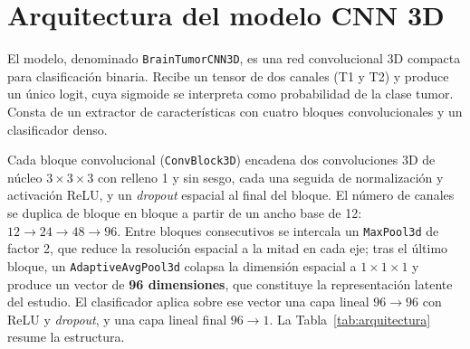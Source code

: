 \section{Arquitectura del modelo CNN 3D}

El modelo, denominado \texttt{BrainTumorCNN3D}, es una red convolucional 3D
compacta para clasificación binaria. Recibe un tensor de dos canales (T1 y T2) y
produce un único logit, cuya sigmoide se interpreta como probabilidad de la
clase tumor. Consta de un extractor de características con cuatro bloques
convolucionales y un clasificador denso.

Cada bloque convolucional (\texttt{ConvBlock3D}) encadena dos convoluciones 3D
de núcleo $3\times3\times3$ con relleno 1 y sin sesgo, cada una seguida de
normalización y activación ReLU, y un \emph{dropout} espacial al final del
bloque. El número de canales se duplica de bloque en bloque a partir de un ancho
base de 12: $12 \rightarrow 24 \rightarrow 48 \rightarrow 96$. Entre bloques
consecutivos se intercala un \texttt{MaxPool3d} de factor 2, que reduce la
resolución espacial a la mitad en cada eje; tras el último bloque, un
\texttt{AdaptiveAvgPool3d} colapsa la dimensión espacial a $1\times1\times1$ y
produce un vector de \textbf{96 dimensiones}, que constituye la representación
latente del estudio. El clasificador aplica sobre ese vector una capa lineal
$96 \rightarrow 96$ con ReLU y \emph{dropout}, y una capa lineal final
$96 \rightarrow 1$. La Tabla~\ref{tab:arquitectura} resume la estructura.

